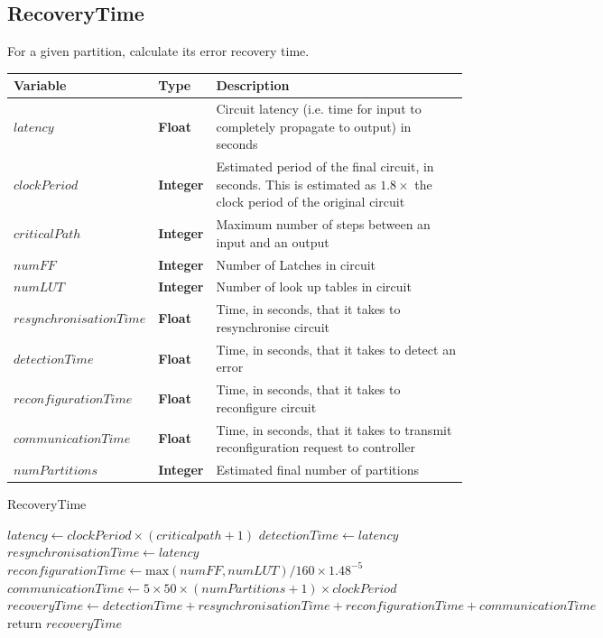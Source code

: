\documentclass[12pt,final,oneside]{dwThesis} %
\begin{document}
   \newpage
   \subsection{RecoveryTime}
   For a given partition, calculate its error recovery time.
   \begin{algorithm}
      \begin{center}
         \begin{tabularx}{\linewidth}{llX}
            \toprule
            Variable & Type & Description\\
            \midrule
            $latency$ &\textbf{ Float } &  Circuit latency (i.e. time for input to completely propagate to output) in seconds\\
            $clockPeriod$ &\textbf{ Integer } & Estimated period of the final circuit, in seconds. This is estimated as $1.8\times$ the clock period of the original circuit\\
            $criticalPath$ &\textbf{ Integer } &  Maximum number of steps between an input and an output\\
            $numFF$ &\textbf{ Integer } &  Number of Latches in circuit\\
            $numLUT$ &\textbf{ Integer } &  Number of look up tables in circuit\\
            $resynchronisationTime$ &\textbf{ Float } &  Time, in seconds, that it takes to resynchronise circuit\\
            $detectionTime$ &\textbf{ Float } &  Time, in seconds, that it takes to detect an error\\
            $reconfigurationTime$ &\textbf{ Float } &  Time, in seconds, that it takes to reconfigure circuit\\
            $communicationTime$ &\textbf{ Float } &  Time, in seconds, that it takes to transmit reconfiguration request to controller\\
            $numPartitions$ &\textbf{ Integer } &  Estimated final number of partitions \\
            \bottomrule
         \end{tabularx}
      \end{center}
      \caption{RecoveryTime}\label{recoverytime}
      \begin{algorithmic}[1]
         \State $latency \gets clockPeriod\times{}(criticalpath+1)$
         \State $detectionTime \gets latency$
         \State $resynchronisationTime \gets latency$
         \State $reconfigurationTime \gets \mbox{max}(numFF, numLUT)/160\times 1.48^{-5}$
         \State $communicationTime \gets 5\times 50\times(numPartitions+1)\times clockPeriod$
         \State $recoveryTime \gets detectionTime+resynchronisationTime+reconfigurationTime+communicationTime$
         \State return $recoveryTime$
         \EndProcedure
      \end{algorithmic}
   \end{algorithm}
\end{document}
